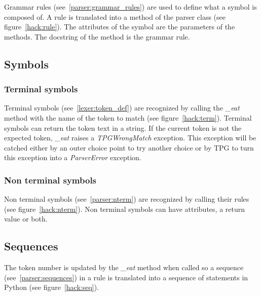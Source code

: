 Grammar rules (see~\ref{parser:grammar_rules}) are used to define what a symbol is composed of.
A rule is translated into a method of the parser class (see figure~\ref{hack:rule}).
The attributes of the symbol are the parameters of the methods.
The docstring of the method is the grammar rule.


\clearpage
\subsection{Symbols}

\subsubsection{Terminal symbols}

Terminal symbols (see~\ref{lexer:token_def}) are recognized by calling the \emph{\_eat} method with the name of the token to match (see figure~\ref{hack:term}).
Terminal symbols can return the token text in a string.
If the current token is not the expected token, \emph{\_eat} raises a \emph{TPGWrongMatch} exception.
This exception will be catched either by an outer choice point to try another choice or by TPG to turn this exception into a \emph{ParserError} exception.


\subsubsection{Non terminal symbols}

Non terminal symbols (see~\ref{parser:nterm}) are recognized by calling their rules (see figure~\ref{hack:nterm}).
Non terminal symbols can have attributes, a return value or both.


\clearpage
\subsection{Sequences}										\label{hack:sequences}

The token number is updated by the \emph{\_eat} method when called so a sequence (see~\ref{parser:sequences}) in a rule is translated into a sequence of statements in Python (see figure~\ref{hack:seq}).


